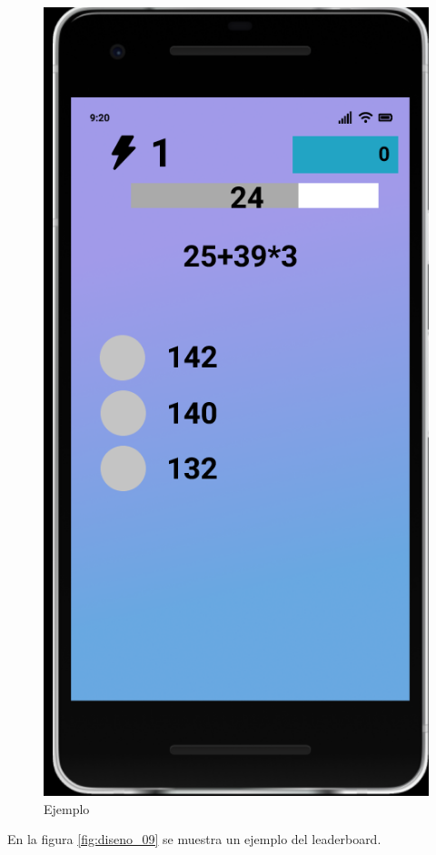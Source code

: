\documentclass{article}
\begin{document}
\begin{figure}[H]
    \centering
    \includegraphics[scale=0.8]{imgs/Figma/Ejemplo}
    \caption{Ejemplo}
    \label{fig:diseno_08}
\end{figure}

En la figura \ref{fig:diseno_09} se muestra un ejemplo del leaderboard.
\end{document}
